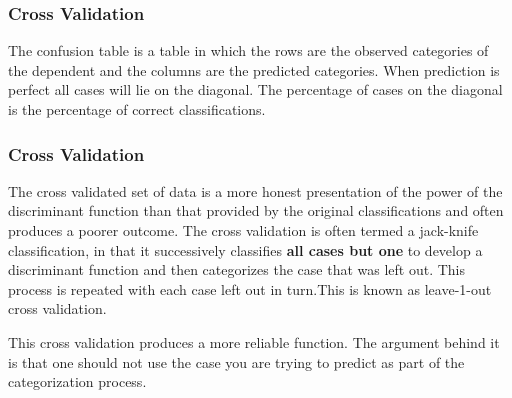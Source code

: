 \documentclass[PredictiveAnalytics101.tex]{subfiles}
\begin{document}
	
	\begin{frame}
		\frametitle{Cross Validation}
		
		The confusion
		table is a table in which the rows are the observed categories of the dependent and
		the columns are the predicted categories. When prediction is perfect all cases will lie on the
		diagonal. The percentage of cases on the diagonal is the percentage of correct classifications. 
	\end{frame}
	\begin{frame}
		\frametitle{Cross Validation}
		\Large
		The cross validated set of data is a more honest presentation of the power of the
		discriminant function than that provided by the original classifications and often produces
		a poorer outcome. The cross validation is often termed a jack-knife classification, in that
		it successively classifies \textbf{all cases but one} to develop a discriminant function and then
		categorizes the case that was left out. This process is repeated with each case left out in
		turn.This is known as leave-1-out cross validation. 
	\end{frame}
	\begin{frame}
		
		This cross validation produces a more reliable function. The argument behind it is that
		one should not use the case you are trying to predict as part of the categorization process.
		
	\end{frame}
	
\end{document}
